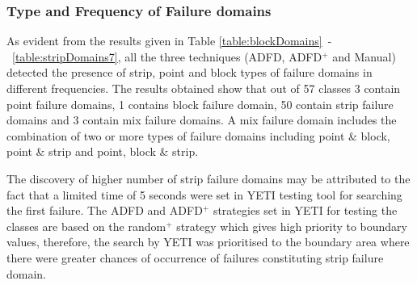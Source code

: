 







\subsubsection{Type and Frequency of Failure domains}

As evident from the results given in Table \ref{table:blockDomains}~-~\ref{table:stripDomains7}, all the three techniques (ADFD, ADFD$^+$ and Manual) detected the presence of strip, point and block types of failure domains in different frequencies. The results obtained show that out of 57 classes 3 contain point failure domains, 1 contains block failure domain, 50 contain strip failure domains and 3 contain mix failure domains. A mix failure domain includes the combination of two or more types of failure domains including point \& block, point \& strip and point, block \& strip.


The discovery of higher number of strip failure domains may be attributed to the fact that a limited time of 5 seconds were set in YETI testing tool for searching the first failure. The ADFD and ADFD$^+$ strategies set in YETI for testing the classes are based on the random$^+$ strategy which gives high priority to boundary values, therefore, the search by YETI was prioritised to the boundary area where there were greater chances of occurrence of failures constituting strip failure domain.


